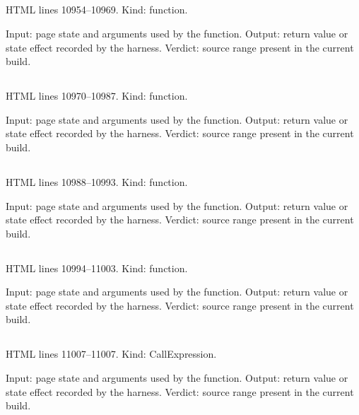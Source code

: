 \subsection*{\texttt{}}
\label{vf_592_pdfStr}
HTML lines 10954--10969. Kind: function.

Input: page state and arguments used by the function.
Output: return value or state effect recorded by the harness.
Verdict: source range present in the current build.

\subsection*{\texttt{}}
\label{vf_593_pdfWidth}
HTML lines 10970--10987. Kind: function.

Input: page state and arguments used by the function.
Output: return value or state effect recorded by the harness.
Verdict: source range present in the current build.

\subsection*{\texttt{}}
\label{vf_594_pdfFit}
HTML lines 10988--10993. Kind: function.

Input: page state and arguments used by the function.
Output: return value or state effect recorded by the harness.
Verdict: source range present in the current build.

\subsection*{\texttt{}}
\label{vf_595_pdfWrap}
HTML lines 10994--11003. Kind: function.

Input: page state and arguments used by the function.
Output: return value or state effect recorded by the harness.
Verdict: source range present in the current build.

\subsection*{\texttt{}}
\label{vf_596_MISSY_TEXT}
HTML lines 11007--11007. Kind: CallExpression.

Input: page state and arguments used by the function.
Output: return value or state effect recorded by the harness.
Verdict: source range present in the current build.

